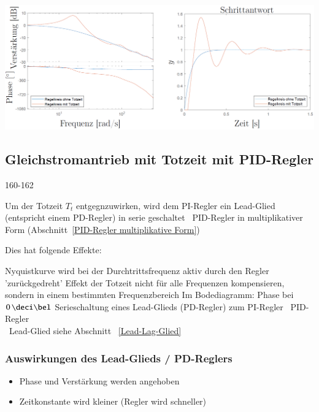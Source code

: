 \includegraphics[width=\columnwidth]{images/gleichstromantrieb_pi-regler_totzeit_step_response.png}


\subsection{Gleichstromantrieb mit Totzeit mit PID-Regler}{160-162}

Um der Totzeit $T_t$ entgegnzuwirken, wird dem PI-Regler ein Lead-Glied (entspricht einem PD-Regler) in serie geschaltet 
\textrightarrow\ PID-Regler in multiplikativer Form (Abschnitt~\ref{PID-Regler multiplikative Form})

\medskip
Dies hat folgende Effekte:
\begin{outline}
    \1 Nyquistkurve wird bei der Durchtrittsfrequenz aktiv durch den Regler 'zurückgedreht' 
        \2 Effekt der Totzeit nicht für alle Frequenzen kompensieren, sondern in einem bestimmten Frequenzbereich
        \2 Im Bodediagramm: Phase bei $0 \, \deci \bel$ 
    \1 Serieschaltung eines Lead-Glieds (PD-Regler) zum PI-Regler \textrightarrow\ PID-Regler \\
        \textrightarrow\ Lead-Glied siehe Abschnitt ~\ref{Lead-Lag-Glied}
\end{outline}


\subsubsection{Auswirkungen des Lead-Glieds / PD-Reglers}

\begin{itemize}
    \item Phase und Verstärkung werden angehoben
    \item Zeitkonstante wird kleiner (Regler wird schneller)
\end{itemize}

